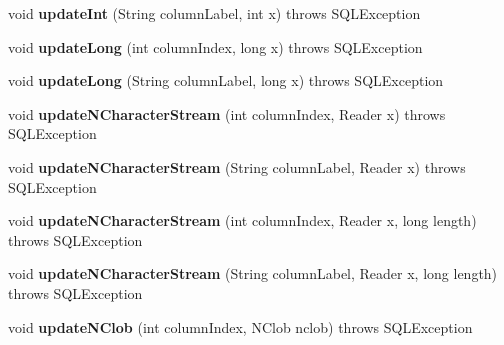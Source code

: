 \begin{DoxyCompactItemize}
\item 
\mbox{\label{classsimpledb_1_1jdbc_1_1ResultSetAdapter_a3c4c8da3c4425a4136b492140e6c5a0c}} 
void {\bfseries update\+Int} (String column\+Label, int x)  throws S\+Q\+L\+Exception 
\item 
\mbox{\label{classsimpledb_1_1jdbc_1_1ResultSetAdapter_a597556ad534f42d0d9ab201873a28b14}} 
void {\bfseries update\+Long} (int column\+Index, long x)  throws S\+Q\+L\+Exception 
\item 
\mbox{\label{classsimpledb_1_1jdbc_1_1ResultSetAdapter_a6364f4749e29e3a62870dd609fe06767}} 
void {\bfseries update\+Long} (String column\+Label, long x)  throws S\+Q\+L\+Exception 
\item 
\mbox{\label{classsimpledb_1_1jdbc_1_1ResultSetAdapter_a932f47b8307ac729a27ce64b0168a0fa}} 
void {\bfseries update\+N\+Character\+Stream} (int column\+Index, Reader x)  throws S\+Q\+L\+Exception 
\item 
\mbox{\label{classsimpledb_1_1jdbc_1_1ResultSetAdapter_aec9f27e8d2161a201fdd035df184255c}} 
void {\bfseries update\+N\+Character\+Stream} (String column\+Label, Reader x)  throws S\+Q\+L\+Exception 
\item 
\mbox{\label{classsimpledb_1_1jdbc_1_1ResultSetAdapter_a48ae482e56e948941e586c5f8728cd56}} 
void {\bfseries update\+N\+Character\+Stream} (int column\+Index, Reader x, long length)  throws S\+Q\+L\+Exception 
\item 
\mbox{\label{classsimpledb_1_1jdbc_1_1ResultSetAdapter_a81bdab09a5f269770e817879ccec60e8}} 
void {\bfseries update\+N\+Character\+Stream} (String column\+Label, Reader x, long length)  throws S\+Q\+L\+Exception 
\item 
\mbox{\label{classsimpledb_1_1jdbc_1_1ResultSetAdapter_a34e893a1f5a68e44fbc2f74a438074ff}} 
void {\bfseries update\+N\+Clob} (int column\+Index, N\+Clob nclob)  throws S\+Q\+L\+Exception 

\end{DoxyCompactItemize}
